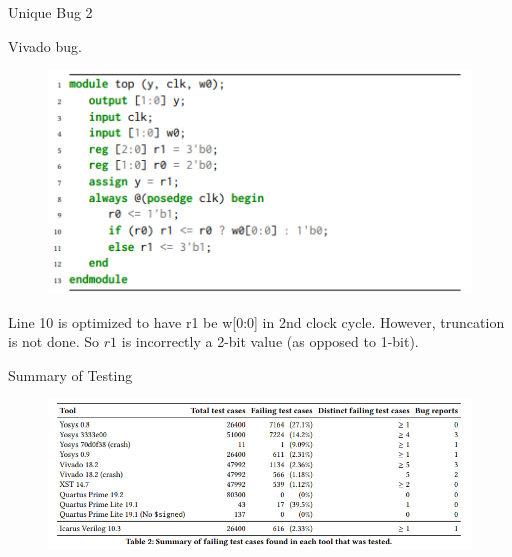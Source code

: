 \documentclass[xcolor=dvipsnames]{beamer}
\begin{document}
    \begin{frame}{Unique Bug 2}
        
        Vivado bug.
        \begin{figure}
            \includegraphics[scale=0.8]{Vivado.PNG}
        \end{figure}

        Line 10 is optimized to have r1 be w[0:0] in 2nd clock cycle.
        However, truncation is not done. So $r1$ is incorrectly a 2-bit value (as opposed to 1-bit).

    \end{frame}


    
    \begin{frame}{Summary of Testing}
        
        \begin{figure}
            \includegraphics[scale=0.6]{Test_Summary.PNG}
        \end{figure}

    \end{frame}
\end{document}
